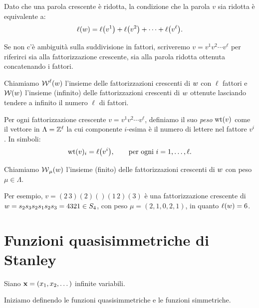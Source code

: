 Dato che una parola crescente \`e ridotta, la condizione 
che la parola $v$ sia ridotta \`e equivalente a:
\[
    \operatorname{\ell}(w) = \operatorname{\ell}\bigl(v^1\bigr) + \operatorname{\ell}\bigl(v^2\bigr) + \cdots + \operatorname{\ell}\bigl(v^\ell\bigr).
\]

Se non c'\`e ambiguit\`a sulla suddivisione in fattori, scriveremo
$v = v^1 v^2 \cdots v^\ell$ per riferirci sia alla fattorizzazione crescente, 
sia alla parola ridotta ottenuta concatenando i fattori.

Chiamiamo $\operatorname{\mathcal{W}}^\ell(w)$ l'insieme delle fattorizzazioni crescenti di $w$
con $\ell$ fattori e $\operatorname{\mathcal{W}}(w)$ l'insieme (infinito) delle fattorizzazioni
crescenti di $w$ ottenute lasciando tendere a infinito il numero $\ell$ di fattori.

\begin{definition}
    \label{def:peso_if}
    Per ogni fattorizzazione crescente $v = v^1 v^2 \cdots v^\ell$, definiamo
    il suo \emph{peso} $\operatorname{wt}(v)$ come il vettore in $\Lambda = \mathbb{Z}^\ell$ la cui
    componente $i$-esima  \`e il numero di lettere nel fattore $v^i$.
    In simboli:
    \[
        \operatorname{wt}(v)_i = \operatorname{\ell}\bigl(v^i\bigr), \qquad \text{per ogni $i = 1, \dots, \ell$.}
    \]

    Chiamiamo $\operatorname{\mathcal{W}}_\mu(w)$ l'insieme (finito) delle fattorizzazioni
    crescenti di $w$ con peso $\mu \in \Lambda$.
\end{definition}


\begin{example}
    Per esempio, 
    $v = (2\,3)(2)()(1\,2)(3)$ \`e una fattorizzazione crescente di 
    $w = s_2 s_3 s_2 s_1 s_2 s_3 = 4321 \in S_4$, con peso
    $\mu = (2, 1, 0, 2, 1)$, in quanto 
    $\operatorname{\ell}(w) = 6 $.
\end{example}


\section{Funzioni quasisimmetriche di Stanley}
\label{sec:funzioni_stanley}


Siano $\mathbf{x} = (x_1, x_2, \dots)$ infinite variabili. 

Iniziamo definendo le funzioni quasisimmetriche e le funzioni
simmetriche.


